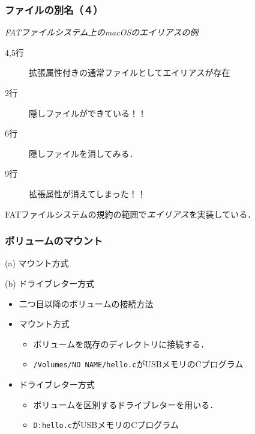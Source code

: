 \documentclass[unicode,handout]{beamer}                   %
\begin{document}
\begin{frame}
  \frametitle{ファイルの別名（４）}
  \emph{FATファイルシステム上のmacOSのエイリアスの例}
  \begin{description}
    \item[4,5行] 拡張属性付きの通常ファイルとしてエイリアスが存在
    \item[2行]   隠しファイルができている！！
    \item[6行]   隠しファイルを消してみる．
    \item[9行]   拡張属性が消えてしまった！！
  \end{description}
  FATファイルシステムの規約の範囲で\emph{エイリアス}を実装している．
  \vfill
\end{frame}

\begin{frame}
  \frametitle{ボリュームのマウント}
  \begin{minipage}{0.49\columnwidth}
    \centerline{(a) マウント方式}
  \end{minipage}
  \begin{minipage}{0.49\columnwidth}
    \centerline{(b) ドライブレター方式}
  \end{minipage}
  \vspace{5mm}
  \begin{itemize}
  \item 二つ目以降のボリュームの接続方法
  \item マウント方式
    \begin{itemize}
    \item ボリュームを既存のディレクトリに接続する．
    \item \texttt{/Volumes/NO NAME/hello.c}がUSBメモリのCプログラム
    \end{itemize}
  \item ドライブレター方式
    \begin{itemize}
    \item ボリュームを区別するドライブレターを用いる．
    \item \texttt{D:{\bs}hello.c}がUSBメモリのCプログラム
    \end{itemize}
  \end{itemize}
\end{frame}
\end{document}
